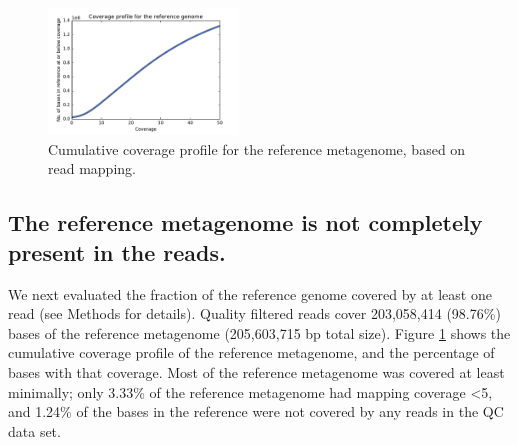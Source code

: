 \documentclass[11pt]{article}
\begin{document}


\begin{figure}[!h]
\centering
\includegraphics[width=0.45\textwidth]{CoverageProfile.pdf}  
\caption{\label{fig:coverage-profile} Cumulative coverage profile for the reference metagenome, based on read mapping. }
\end{figure}

\subsection*{The reference metagenome is not completely present in the reads.}

We next evaluated the fraction of the reference genome covered by at least
one read (see Methods for details). Quality filtered reads cover
203,058,414 (98.76\%) bases of the reference metagenome (205,603,715
bp total size).  Figure \ref{fig:coverage-profile} shows the
cumulative coverage profile of the reference metagenome, and the
percentage of bases with that coverage. Most of the reference
metagenome was covered at least minimally; only 3.33\% of the
reference metagenome had mapping coverage \textless 5, and 1.24\% of
the bases in the reference were not covered by any reads in the QC data
set.
\end{document}
